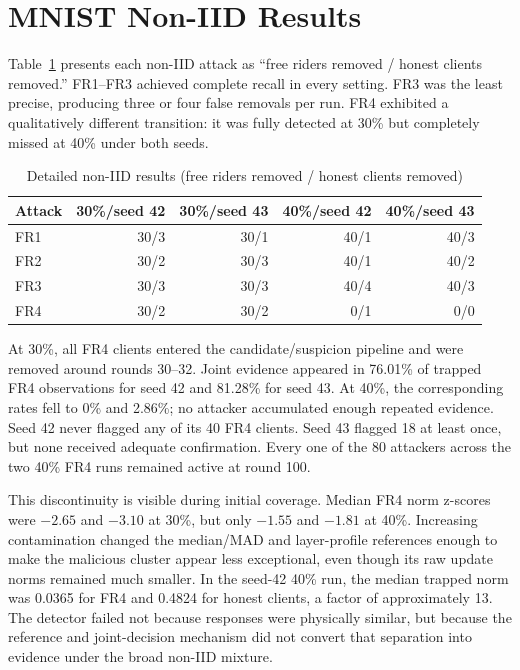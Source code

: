 \section{MNIST Non-IID Results}

Table~\ref{tab:noniid-detail} presents each non-IID attack as ``free riders removed / honest clients removed.'' FR1--FR3 achieved complete recall in every setting. FR3 was the least precise, producing three or four false removals per run. FR4 exhibited a qualitatively different transition: it was fully detected at 30\% but completely missed at 40\% under both seeds.

\begin{table}[htbp]
\centering
\caption{Detailed non-IID results (free riders removed / honest clients removed)}
\label{tab:noniid-detail}
\begin{tabular}{lrrrr}
\toprule
Attack & 30\%/seed 42 & 30\%/seed 43 & 40\%/seed 42 & 40\%/seed 43 \\
\midrule
FR1 & 30/3 & 30/1 & 40/1 & 40/3 \\
FR2 & 30/2 & 30/3 & 40/1 & 40/2 \\
FR3 & 30/3 & 30/3 & 40/4 & 40/3 \\
FR4 & 30/2 & 30/2 & 0/1 & 0/0 \\
\bottomrule
\end{tabular}
\end{table}

At 30\%, all FR4 clients entered the candidate/suspicion pipeline and were removed around rounds 30--32. Joint evidence appeared in 76.01\% of trapped FR4 observations for seed 42 and 81.28\% for seed 43. At 40\%, the corresponding rates fell to 0\% and 2.86\%; no attacker accumulated enough repeated evidence. Seed 42 never flagged any of its 40 FR4 clients. Seed 43 flagged 18 at least once, but none received adequate confirmation. Every one of the 80 attackers across the two 40\% FR4 runs remained active at round 100.

This discontinuity is visible during initial coverage. Median FR4 norm z-scores were $-2.65$ and $-3.10$ at 30\%, but only $-1.55$ and $-1.81$ at 40\%. Increasing contamination changed the median/MAD and layer-profile references enough to make the malicious cluster appear less exceptional, even though its raw update norms remained much smaller. In the seed-42 40\% run, the median trapped norm was 0.0365 for FR4 and 0.4824 for honest clients, a factor of approximately 13. The detector failed not because responses were physically similar, but because the reference and joint-decision mechanism did not convert that separation into evidence under the broad non-IID mixture.

